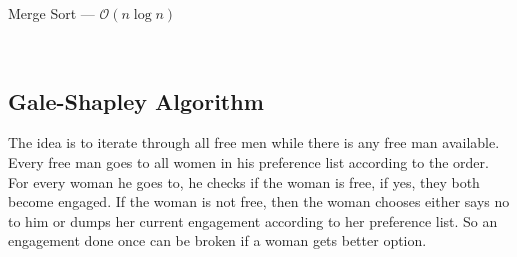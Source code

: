 \begin{algorithm}
	\caption{Merge Sort --- \( \mathcal{O}(n \log n) \) }\label{alg:merge}
	\begin{algorithmic}
		\EndIf{}
		\EndFunction{}
		\\
		 
		 
		 
		 
		\EndFor{}
		 
		\EndFor{}	
		 
		 
		 
		\EndIf{}
		\EndFor{}
		\EndFunction{}
	\end{algorithmic}
\end{algorithm}



\subsection{Gale-Shapley Algorithm}

The idea is to iterate through all free men while there is any free man available. Every free man goes to all women in his preference list according to the order. For every woman he goes to, he checks if the woman is free, if yes, they both become engaged. If the woman is not free, then the woman chooses either says no to him or dumps her current engagement according to her preference list. So an engagement done once can be broken if a woman gets better option.



